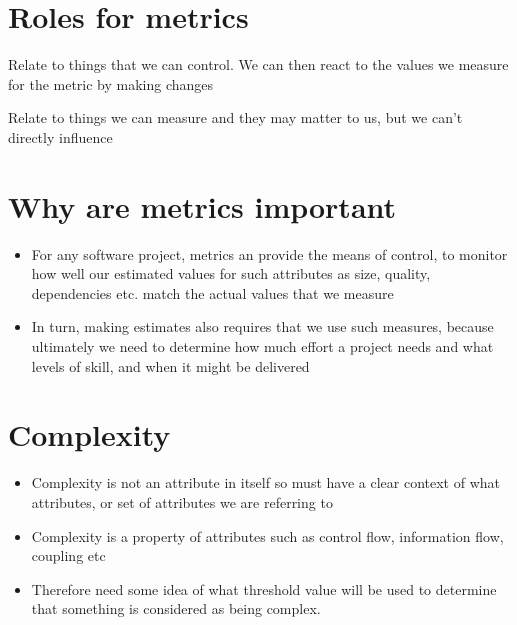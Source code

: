 \documentclass{article}[18pt]
\begin{document}
\section{Roles for metrics}
\begin{definition}
Relate to things that we can control. We can then react to the values we measure for the metric by making changes
\end{definition}
\begin{definition}
Relate to things we can measure and they may matter to us, but we can't directly influence
\end{definition}
\section{Why are metrics important}
\begin{itemize}
	\item For any software project, metrics an provide the means of control, to monitor how well our estimated values for such attributes as size, quality, dependencies etc. match the actual values that we measure
	\item In turn, making estimates also requires that we use such measures, because ultimately we need to determine how much effort a project needs and what levels of skill, and when it might be delivered
\end{itemize}
\section{Complexity}
\begin{itemize}
	\item Complexity is not an attribute in itself so must have a clear context of what attributes, or set of attributes we are referring to
	\item Complexity is a property of attributes such as control flow, information flow, coupling etc
	\item Therefore need some idea of what threshold value will be used to determine that something is considered as being complex.
\end{itemize}
\end{document}

